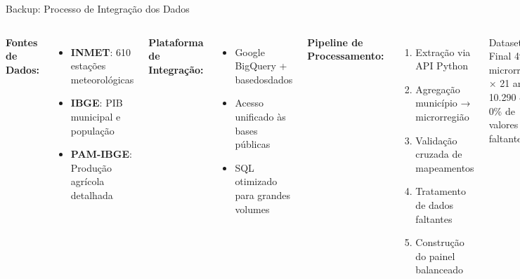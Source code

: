 \documentclass[10pt,aspectratio=169]{beamer}
\begin{document}
\begin{frame}{Backup: Processo de Integração dos Dados}
\begin{columns}
\textbf{Fontes de Dados:}
\begin{itemize}
    \item \textbf{INMET}: 610 estações meteorológicas
    \item \textbf{IBGE}: PIB municipal e população  
    \item \textbf{PAM-IBGE}: Produção agrícola detalhada
\end{itemize}

\textbf{Plataforma de Integração:}
\begin{itemize}
    \item Google BigQuery + basedosdados
    \item Acesso unificado às bases públicas
    \item SQL otimizado para grandes volumes
\end{itemize}

\textbf{Pipeline de Processamento:}
\begin{enumerate}
    \item Extração via API Python
    \item Agregação município → microrregião
    \item Validação cruzada de mapeamentos
    \item Tratamento de dados faltantes
    \item Construção do painel balanceado
\end{enumerate}

\begin{block}{Dataset Final}
490 microrregiões × 21 anos = 10.290 obs\\
0\% de valores faltantes
\end{block}
\end{columns}
\end{frame}
\end{document}

